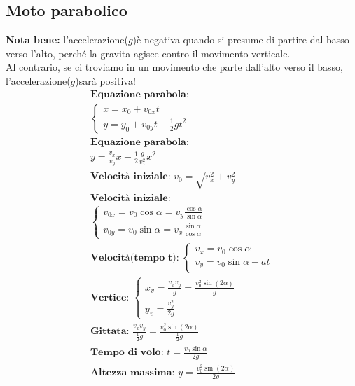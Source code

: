 \subsection{Moto parabolico}
\textbf{Nota bene: } l'accelerazione($g$)è negativa quando si presume di partire dal basso verso l'alto, perché la gravita agisce contro il movimento verticale. \\ Al contrario, se ci troviamo in un movimento che parte dall'alto verso il basso, l'accelerazione($g$)sarà positiva!
\begin{gather*}
    \textbf{Equazione parabola: } \\ \begin{cases}
        x = x_0 + v_{0x} t \\
        y = y_0 + v_{0y} t - \frac{1}{2} g t^2
    \end{cases}
    \\
    \textbf{Equazione parabola: } \\ y = \frac{v_x}{v_y} x - \frac{1}{2} \frac{g}{v_x^2} x^2 \\
    \textbf{Velocità iniziale: } v_0 = \sqrt{v_x^2 + v_y^2} \\
    \textbf{Velocità iniziale: } \\ \begin{cases}
        v_{0x} = v_0 \cos \alpha  = v_y \frac{\cos \alpha}{\sin \alpha} \\
        v_{0y} = v_0 \sin \alpha = v_x \frac{\sin \alpha }{\cos \alpha}
    \end{cases}
    \\
    \textbf{Velocità(tempo t): } \begin{cases}
        v_x = v_0 \cos \alpha \\
        v_y = v_0 \sin \alpha - a t
    \end{cases}
    \\
    \textbf{Vertice: } \begin{cases}
        x_v = \frac{v_x v_y}{g} = \frac{v_0^2 \sin (2\alpha)}{g} \\
        y_v = \frac{v_y^2}{2g}
    \end{cases}
    \\
    \textbf{Gittata: } \frac{v_x v_y}{\frac{1}{2}g} = \frac{v_0^2 \sin (2 \alpha)}{\frac{1}{2}g} \\
    \textbf{Tempo di volo: } t = \frac{v_0 \sin \alpha}{2g} \\
    \textbf{Altezza massima: } y = \frac{v_0^2 \sin (2 \alpha)}{2g}
\end{gather*}

